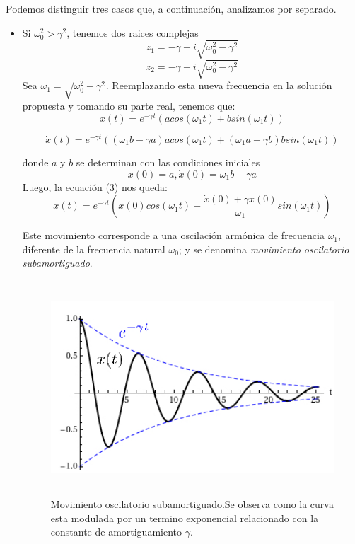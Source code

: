 \documentclass[a4paper,12pt]{article}
\begin{document}
Podemos distinguir tres casos que, a continuaci\'on, analizamos por separado.

\begin{itemize}
\item Si $\omega_0^2 > \gamma^2$, tenemos dos raices complejas
$$z_{1} = -\gamma + i\sqrt{\omega_0^2 - \gamma^2}$$  $$z_{2} = -\gamma - i\sqrt{\omega_0^2 - \gamma^2}$$
Sea $\omega_{1} = \sqrt{\omega_0^2 - \gamma^2}$. Reemplazando esta nueva frecuencia en la soluci\'on propuesta y tomando su parte real, tenemos que:
\begin{equation}
x(t) = e^{-\gamma t}(acos(\omega_{1}t) + bsin(\omega_{1}t))
\end{equation}

$$\dot{x}(t) = e^{-\gamma t}((\omega_{1}b - \gamma a)acos(\omega_{1}t) + (\omega_{1}a - \gamma b)bsin(\omega_{1}t))$$

donde $a$ y $b$ se determinan con las condiciones iniciales
$$ x(0) = a, \dot{x}(0) = \omega_{1}b - \gamma a$$
Luego, la ecuaci\'on (3) nos queda:
\begin{equation}
x(t) = e^{-\gamma t}(x(0)cos(\omega_{1}t) + \frac{\dot{x}(0) + \gamma x(0)}{\omega_{1}}sin(\omega_{1}t))
\end{equation}

Este movimiento corresponde a una oscilaci\'on arm\'onica de frecuencia $\omega_{1}$, diferente de la frecuencia natural $\omega_{0}$; y se denomina \textit{movimiento oscilatorio subamortiguado}.

\begin{figure}[H]
\begin{center}
\includegraphics[height=8cm]{oscilacion_subamortiguada.jpg}
\caption[width=5cm]{Movimiento oscilatorio subamortiguado.\newline Se observa como la curva esta modulada por un termino exponencial relacionado con la constante de amortiguamiento $\gamma$.}
\end{center}
\end{figure}


\end{itemize}
\end{document}
